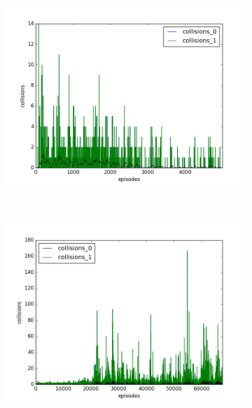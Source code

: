 \begin{figure}[t]
  \vspace{-0.5cm}
  \begin{subfigure}[t]{\figscale\linewidth}
    \hspace*{-2.75cm}
    \includegraphics[width=1.5\textwidth]
    {../results/dqn_1vs1/collisions.png}
    \label{fig:dqn-1vs1-collisions}
  \end{subfigure}
  ~
  \begin{subfigure}[t]{\figscale\linewidth}
    \hspace*{-1.4cm}
    \includegraphics[width=1.5\textwidth]
    {../results/ddpg_1vs1/collisions.png}
    \label{fig:ddpg-1vs1-collisions}
  \end{subfigure}
  ~
  \begin{subfigure}[t]{\figscale\linewidth}

\end{subfigure}
\end{figure}

